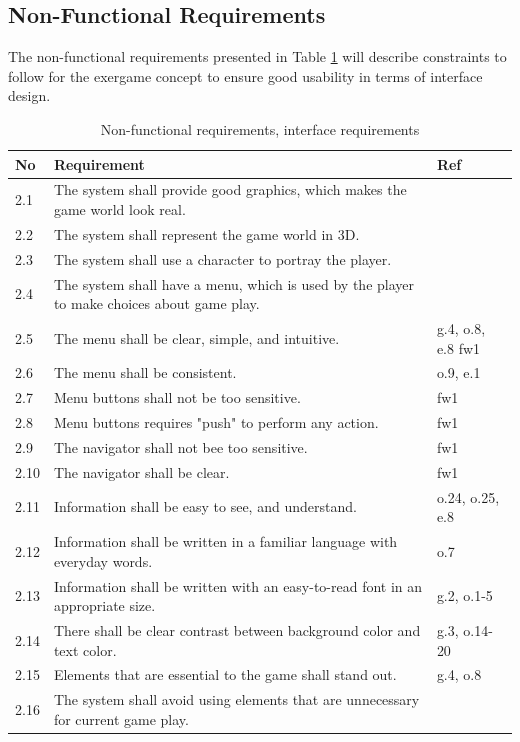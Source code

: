 \subsection{Non-Functional Requirements}
The non-functional requirements presented in Table \ref{tab:nfunc} will describe constraints to follow for the exergame concept to ensure good usability in terms of interface design.

\begin{table} [H]
\centering
\begin{tabular}{|>{\raggedright}p{}|p{}|p{2cm}|} 
\hline
\textbf{No} & \textbf{Requirement} & \textbf{Ref} \\ \hline
2.1 & The system shall provide good graphics, which makes the game world look real. & \cite{understandingvg} \\ \hline
2.2 & The system shall represent the game world in 3D. & \cite{understandingvg}\\ \hline
2.3 & The system shall use a character to portray the player. & \cite{understandingvg}\\ \hline
2.4 & The system shall have a menu, which is used by the player to make choices about game play. & \cite{gerling2} \\ \hline
2.5 & The menu shall be clear, simple, and intuitive. & \cite{sweetser} g.4, o.8, e.8 fw1 \\ \hline
2.6 & The menu shall be consistent. &  o.9, e.1 \\ \hline
2.7 & Menu buttons shall not be too sensitive. &  fw1 \\ \hline
2.8 & Menu buttons requires "push" to perform any action. &  fw1\\ \hline
2.9 & The navigator shall not bee too sensitive. &  fw1\\ \hline
2.10 & The navigator shall be clear. &  fw1\\ \hline
2.11 & Information shall be easy to see, and understand. &  o.24, o.25, e.8\\ \hline
2.12 & Information shall be written in a familiar language with everyday words. &  o.7\\ \hline
2.13 & Information shall be written with an easy-to-read font in an appropriate size. &  g.2, o.1-5 \\ \hline
2.14 & There shall be clear contrast between background color and text color. &  g.3, o.14-20 \\ \hline
2.15 & Elements that are essential to the game shall stand out. &  g.4, o.8\\ \hline
2.16 & The system shall avoid using elements that are unnecessary for current game play.  & \cite{sweetser}\\ \hline
\end{tabular}
\caption[Non-functional requirements]{Non-functional requirements, interface requirements}
\label{tab:nfunc}
\end{table} 

